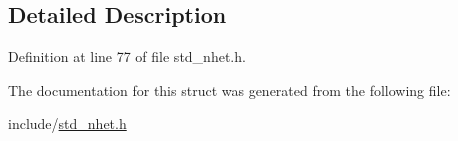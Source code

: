 \subsection{Detailed Description}


Definition at line 77 of file std\+\_\+nhet.\+h.



The documentation for this struct was generated from the following file\+:\begin{DoxyCompactItemize}
\item 
include/\mbox{\hyperlink{std__nhet_8h}{std\+\_\+nhet.\+h}}\end{DoxyCompactItemize}
